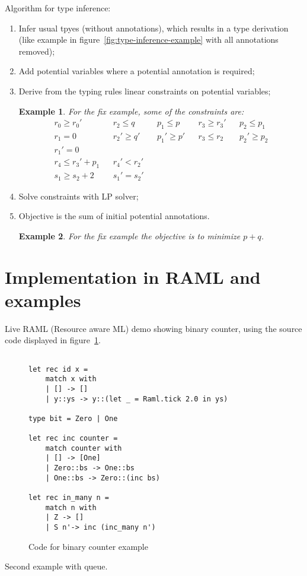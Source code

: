 \documentclass{article}
\newtheorem{example}{Example}
\begin{document}
Algorithm for type inference:
\begin{enumerate}
\item Infer usual tpyes (without annotations), which results in a type derivation (like example in figure~\ref{fig:type-inference-example} with all annotations removed);
\item Add potential variables where a potential annotation is required;
\item Derive from the typing rules linear constraints on potential variables;
  \begin{example}
    For the fix example, some of the constraints are:
    \begin{align*}
      r_0 \geq r_0' && r_2\leq q && p_1\leq p && r_3 \geq r_3' && p_2\leq p_1 \\
      r_1=0 && r_2'\geq q' && p_1'\geq p' && r_3\leq r_2 && p_2'\geq p_2 \\
      r_1'=0 && && && && \\
      r_4\leq r_3'+p_1 && r_4'<r_2' && && && \\
      s_1 \geq s_2+2 && s_1'=s_2' && && &&
    \end{align*}
  \end{example}
  
\item Solve constraints with LP solver;
\item Objective is the sum of initial potential annotations.
  \begin{example}
    For the fix example the objective is to minimize $p+q$.
  \end{example}
\end{enumerate}

\section{Implementation in RAML and examples}
Live RAML (Resource aware ML) demo showing binary counter, using the source code displayed in figure~\ref{code:binary-counter}.
\begin{figure}[ht]
\begin{lstlisting}[language=caml,frame=single,basicstyle=\footnotesize]

let rec id x =
    match x with
    | [] -> []
    | y::ys -> y::(let _ = Raml.tick 2.0 in ys)

type bit = Zero | One

let rec inc counter = 
    match counter with
    | [] -> [One]
    | Zero::bs -> One::bs 
    | One::bs -> Zero::(inc bs)

let rec in_many n = 
    match n with
    | Z -> []
    | S n'-> inc (inc_many n')
\end{lstlisting}
\label{code:binary-counter}
\caption{Code for binary counter example}
\end{figure}
Second example with queue.
\end{document}
